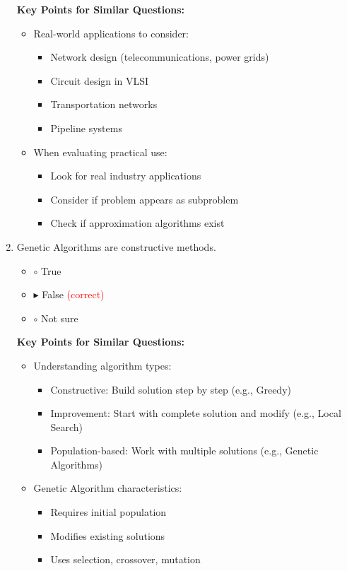 \begin{enumerate}[label=\alph*)]
\textbf{Key Points for Similar Questions:}
\begin{itemize}
\item Real-world applications to consider:
  \begin{itemize}
  \item Network design (telecommunications, power grids)
  \item Circuit design in VLSI
  \item Transportation networks
  \item Pipeline systems
  \end{itemize}
\item When evaluating practical use:
  \begin{itemize}
  \item Look for real industry applications
  \item Consider if problem appears as subproblem
  \item Check if approximation algorithms exist
  \end{itemize}
\end{itemize}

\item Genetic Algorithms are constructive methods.
\begin{itemize}
\item $\circ$ True
\item $\blacktriangleright$ False \hspace{1em} \textcolor{red}{(correct)}
\item $\circ$ Not sure
\end{itemize}

\textbf{Key Points for Similar Questions:}
\begin{itemize}
\item Understanding algorithm types:
  \begin{itemize}
  \item Constructive: Build solution step by step (e.g., Greedy)
  \item Improvement: Start with complete solution and modify (e.g., Local Search)
  \item Population-based: Work with multiple solutions (e.g., Genetic Algorithms)
  \end{itemize}
\item Genetic Algorithm characteristics:
  \begin{itemize}
  \item Requires initial population
  \item Modifies existing solutions
  \item Uses selection, crossover, mutation
  \end{itemize}
\end{itemize}


\end{enumerate}

